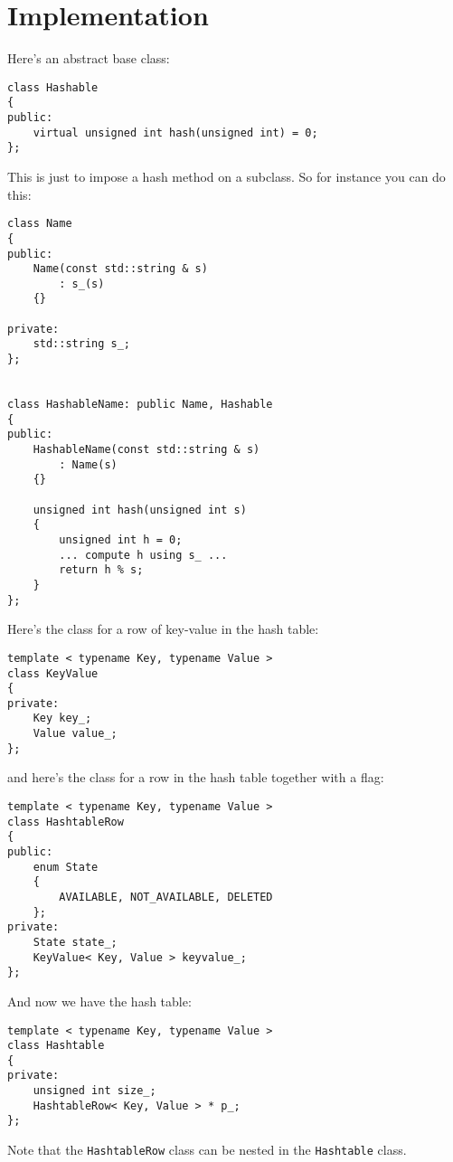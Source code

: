\newpage
\section{Implementation}

Here's an abstract base class:
{\small
\begin{Verbatim}[frame=single]
class Hashable
{
public:
    virtual unsigned int hash(unsigned int) = 0;
};
\end{Verbatim}
}
This is just to impose a hash method on a subclass.
So for instance you can do this:
{\small
\begin{Verbatim}[frame=single]
class Name
{
public:
    Name(const std::string & s)
        : s_(s)
    {}

private:
    std::string s_;
};


class HashableName: public Name, Hashable
{
public:
    HashableName(const std::string & s)
        : Name(s) 
    {}
    
    unsigned int hash(unsigned int s)
    {
        unsigned int h = 0;
        ... compute h using s_ ...
        return h % s;
    }
};
\end{Verbatim}
}
Here's the class for a row of key-value in the hash table:
{\small
\begin{Verbatim}[frame=single]
template < typename Key, typename Value >
class KeyValue
{
private:
    Key key_;
    Value value_;
};
\end{Verbatim}
}
and here's the class for a row in the hash table together with a 
flag:
{\small
\begin{Verbatim}[frame=single]
template < typename Key, typename Value >
class HashtableRow
{
public:
    enum State
    { 
        AVAILABLE, NOT_AVAILABLE, DELETED 
    };
private:
    State state_;
    KeyValue< Key, Value > keyvalue_;
};
\end{Verbatim}
}
And now we have the hash table:
{\small
\begin{Verbatim}[frame=single]
template < typename Key, typename Value >
class Hashtable
{
private:
    unsigned int size_;
    HashtableRow< Key, Value > * p_;
};
\end{Verbatim}
}

Note that the \verb!HashtableRow! class can be nested in the \verb!Hashtable!
class.











